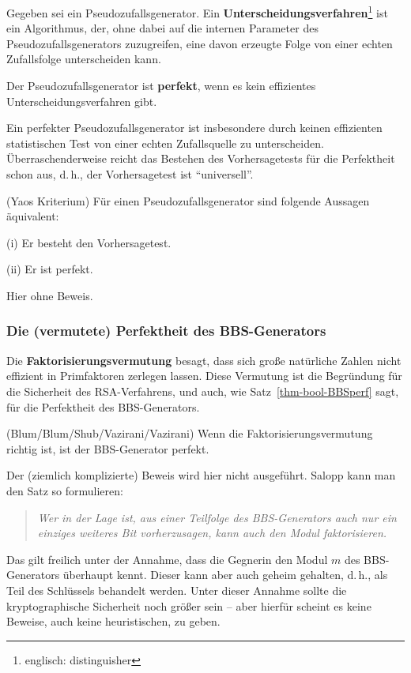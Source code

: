 \begin{refsegment}
\begin{definition}\label{def-bool-prg-perf}
  Gegeben sei ein Pseudozufallsgenerator.
  Ein \textbf{ Unterscheidungsverfahren}\footnote{%
    englisch: distinguisher
  } ist ein Algorithmus, der, ohne dabei auf die internen Parameter des
  Pseudozufallsgenerators zuzugreifen, eine davon erzeugte Folge von
  einer echten Zufallsfolge unterscheiden kann.

  Der Pseudozufallsgenerator ist \textbf{perfekt}, wenn
  es kein effizientes Unterscheidungsverfahren gibt.
\end{definition}
Ein perfekter Pseudozufallsgenerator ist insbesondere durch keinen
effizienten statistischen Test von einer echten Zufallsquelle zu
unterscheiden. Überraschenderweise reicht das Bestehen des
Vorhersagetests für die Perfektheit schon aus, d.\,h., der
Vorhersagetest ist "`universell"'.

\begin{satz} {\rm (Yaos Kriterium)}\label{thm-bool-YaoTh}
  Für einen Pseudozufallsgenerator sind folgende Aussagen äquivalent:

   {\rm (i)} Er besteht den Vorhersagetest.

   {\rm (ii)} Er ist perfekt.
\end{satz}
Hier ohne Beweis.


\subsubsection*{Die (vermutete) Perfektheit des BBS-Generators}

Die \textbf{Faktorisierungsvermutung}
besagt, dass sich große natürliche
Zahlen nicht effizient in Primfaktoren zerlegen lassen. Diese
Vermutung ist die Begründung für die Sicherheit des RSA-Verfahrens,
und auch, wie Satz~\ref{thm-bool-BBSperf} sagt, für die Perfektheit
des BBS-Generators.

\begin{satz} {\rm (Blum/Blum/Shub/Vazirani/Vazirani)}\label{thm-bool-BBSperf}
   Wenn die Fak\-to\-ri\-sie\-rungs\-vermutung richtig ist, ist der BBS-Generator
   perfekt.
\end{satz}

Der (ziemlich komplizierte) Beweis wird hier nicht ausgeführt.
Salopp kann man den Satz so formulieren:
\begin{quote}
   {\em Wer in der Lage ist, aus einer Teilfolge des BBS-Generators
   auch nur ein einziges weiteres Bit vorherzusagen, kann auch
   den Modul faktorisieren.}
\end{quote}
Das gilt freilich unter der Annahme, dass die Gegnerin den Modul $m$ des BBS-Generators
überhaupt kennt. Dieser kann aber auch geheim gehalten, d.\,h., als Teil des
Schlüssels behandelt werden. Unter dieser Annahme sollte die kryptographische
Sicherheit noch größer sein -- aber hierfür scheint es keine Beweise, auch
keine heuristischen, zu geben.


\end{refsegment}
